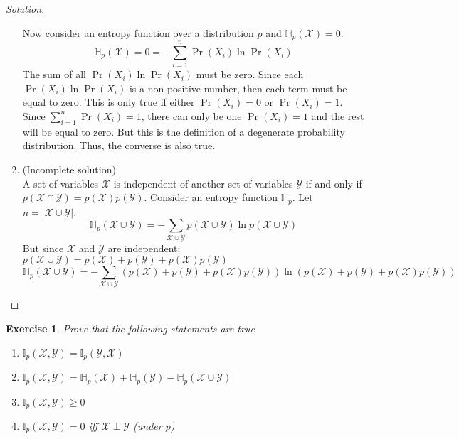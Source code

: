 \documentclass{amsart}
\theoremstyle{plain}
\newtheorem{exercise}{Exercise}
\newenvironment{solution}{\begin{proof}[Solution]}{\end{proof}}
\newcommand{\set}[1]{\mathcal{#1}}
\newcommand{\entropy}{\mathbb{H}_p}
\newcommand{\mutinf}{\mathbb{I}_p}
\begin{document}
\begin{solution}
\begin{enumerate}[label=(\roman*)]
      Now consider an entropy function over a distribution $p$ and $\entropy(\set{X})=0$.
      \begin{equation*}
        \entropy(\set{X})=0=-\sum_{i=1}^n \Pr(X_i)\ln\Pr(X_i)
      \end{equation*}
      The sum of all $\Pr(X_i)\ln\Pr(X_i)$ must be zero. Since each $\Pr(X_i)\ln\Pr(X_i)$ is a
      non-positive number, then each term must be equal to zero. This is only true if either
      $\Pr(X_i)=0$ or $\Pr(X_i)=1$. Since $\sum_{i=1}^n \Pr(X_i)=1$, there can only be one
      $\Pr(X_i)=1$ and the rest will be equal to zero. But this is the definition of a degenerate
      probability distribution. Thus, the converse is also true.
    \item (Incomplete solution)\\
      A set of variables $\set{X}$ is independent of another set of variables $\set{Y}$ if and
      only if $p(\set{X}\cap\set{Y})=p(\set{X})p(\set{Y})$. Consider an entropy function
      $\entropy$. Let $n=|\set{X}\cup\set{Y}|$.
      \begin{equation*}
        \entropy(\set{X}\cup\set{Y})=-\sum_{\set{X}\cup\set{Y}} p(\set{X}\cup\set{Y})\ln p(\set{X}
        \cup\set{Y})
      \end{equation*}
      But since $\set{X}$ and $\set{Y}$ are independent: $p(\set{X}\cup\set{Y})=p(\set{X})+
      p(\set{Y})+p(\set{X})p(\set{Y})$
      \begin{equation*}
        \entropy(\set{X}\cup\set{Y})=-\sum_{\set{X}\cup\set{Y}}(p(\set{X})+p(\set{Y})+p(\set{X})
        p(\set{Y}))\ln (p(\set{X})+p(\set{Y})+p(\set{X})p(\set{Y}))
      \end{equation*}
  \end{enumerate}
\end{solution}

\begin{exercise}
  Prove that the following statements are true
  \begin{enumerate}
    \item $\mutinf(\set{X},\set{Y})=\mutinf(\set{Y},\set{X})$
    \item $\mutinf(\set{X},\set{Y})=\entropy(\set{X})+\entropy(\set{Y})-
      \entropy(\set{X}\cup\set{Y})$
    \item $\mutinf(\set{X},\set{Y})\geq 0$
    \item $\mutinf(\set{X},\set{Y})=0$ iff $\set{X}\perp\set{Y}$ (under $p$)
  \end{enumerate}
\end{exercise}
\end{document}
